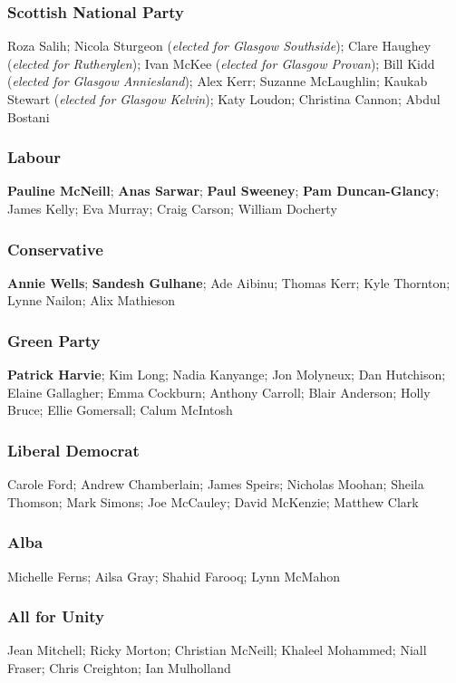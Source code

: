 \begin{resultsiii}
	\subsubsection*{Scottish National Party}
	Roza Salih; Nicola Sturgeon (\emph{elected for Glasgow Southside}); Clare Haughey (\emph{elected for Rutherglen}); Ivan McKee (\emph{elected for Glasgow Provan}); Bill Kidd (\emph{elected for Glasgow Anniesland}); Alex Kerr; Suzanne McLaughlin; Kaukab Stewart (\emph{elected for Glasgow Kelvin}); Katy Loudon; Christina Cannon; Abdul Bostani
	
	\subsubsection*{Labour}
	\textbf{Pauline McNeill}; \textbf{Anas Sarwar}; \textbf{Paul Sweeney}; \textbf{Pam Duncan-Glancy}; James Kelly; Eva Murray; Craig Carson; William Docherty
	
	\subsubsection*{Conservative}
	\textbf{Annie Wells}; \textbf{Sandesh Gulhane}; Ade Aibinu; Thomas Kerr; Kyle Thornton; Lynne Nailon; Alix Mathieson
	
	\subsubsection*{Green Party}
	\textbf{Patrick Harvie}; Kim Long; Nadia Kanyange; Jon Molyneux; Dan Hutchison; Elaine Gallagher; Emma Cockburn; Anthony Carroll; Blair Anderson; Holly Bruce; Ellie Gomersall; Calum McIntosh
	
	\subsubsection*{Liberal Democrat}
	Carole Ford; Andrew Chamberlain; James Speirs; Nicholas Moohan; Sheila Thomson; Mark Simons; Joe McCauley; David McKenzie; Matthew Clark
	
	\subsubsection*{Alba}
	Michelle Ferns; Ailsa Gray; Shahid Farooq; Lynn McMahon
	
	\subsubsection*{All for Unity}
	Jean Mitchell; Ricky Morton; Christian McNeill; Khaleel Mohammed; Niall Fraser; Chris Creighton; Ian Mulholland
	

\end{resultsiii}
